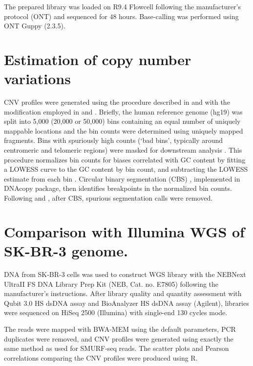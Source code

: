 The prepared library was loaded on R9.4 Flowcell following the
manufacturer's protocol (ONT) and sequenced for 48 hours.  Base-calling
was performed using ONT Guppy (2.3.5).

\section*{Estimation of copy number variations}
CNV profiles were generated using the procedure described in
\cite{baslan2012genome} and \cite{kendall2014computational} with the
modification employed in \cite{gerdtsson2018multiplex} and
\cite{malihi2018clonal}.  Briefly, the human reference genome (hg19) was
split into 5,000 (20,000 or 50,000) bins containing an equal number of
uniquely mappable locations and the bin counts were determined using
uniquely mapped fragments.  Bins with spuriously high counts (`bad
bins', typically around centromeric and telomeric regions) were masked
for downstream analysis \citep{kendall2014computational}.  This
procedure normalizes bin counts for biases correlated with GC content by
fitting a LOWESS curve to the GC content by bin count, and subtracting
the LOWESS estimate from each bin \citep{kendall2014computational}.
Circular binary segmentation (CBS) \citep{olshen2004circular},
implemented in DNAcopy \citep{seshan2010dnacopy} package, then
identifies breakpoints in the normalized bin counts.  Following
\cite{gerdtsson2018multiplex} and \cite{malihi2018clonal}, after CBS,
spurious segmentation calls were removed.

\section*{Comparison with Illumina WGS of SK-BR-3 genome.}
DNA from SK-BR-3 cells was used to construct WGS library with the
NEBNext UltraII FS DNA Library Prep Kit (NEB, Cat. no. E7805) following
the manufacturer's instructions. After library quality and quantity
assessment with Qubit 3.0 HS dsDNA assay and BioAnalyzer HS dsDNA assay
(Agilent), libraries were sequenced on HiSeq 2500 (Illumina) with
single-end 130 cycles mode.

The reads were mapped with BWA-MEM using the default parameters, PCR
duplicates were removed, and CNV profiles were generated using exactly
the same method as used for SMURF-seq reads.  The scatter plots and
Pearson correlations comparing the CNV profiles were produced using R.


